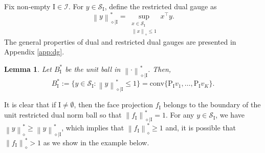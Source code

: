 \documentclass[12pt]{amsart}
\numberwithin{equation}{section}
\numberwithin{equation}{section}
\newtheorem{lemma}[thm]{Lemma}
\theoremstyle{definition}
\newcommand{\I}{\mathrm{I}}
\newcommand{\poly}[1]{\left\|#1\right\|_\diamond}
\newcommand{\polyd}[1]{\left\|#1\right\|^\ast_\diamond}
\newcommand{\polydr}[2]{\left\|#1\right\|^\ast_{\diamond\mid #2}}
\newcommand{\PP}{\mathrm{P}}
\renewcommand{\SS}{\mathcal{S}}
\begin{document}
Fix non-empty $\I\in\mathcal{I}$. For $y\in \SS_{\I}$, define the restricted dual gauge as
\[
\polydr{y}{\I} = \sup_{\substack{x\in \SS_{\I}\\ \poly{x}\leq 1}} x^\top y.
\]
The general properties of dual and restricted dual gauges are presented in Appendix \ref{app:dg}.

\begin{lemma}\label{lem:restr_ball}
	Let $B_{\I}^\ast$ be the unit ball in $\polydr{\cdot}{\I}$. Then,
\[   
B_{\I}^\ast:= \{ y\in\SS_{\I}\colon \polydr{y}{\I}\leq 1\}  = \mathrm{conv}\{\PP_{\I} v_1,\ldots, \PP_{\I} v_K\}. 
\]
\end{lemma}
It is clear that if $\I\neq\emptyset$, then the face projection $f_\I$ belongs to the boundary of the unit restricted dual norm ball so that 
$\polydr{f_\I}{\I}=1$. 
For any $y\in\SS_{\I}$, we have $\polyd{y} \geq \polydr{y}{\I}$, which implies that $\polyd{f_\I}\geq 1$ and, it is possible that $\polyd{f_\I}>1$ as we show in the example below.
\end{document}
